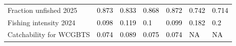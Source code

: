 \documentclass[
]{scrartcl}
\begin{document}
\begin{landscape}
\begin{longtable}[t]{ll>{\raggedright\arraybackslash}p{5em}>{\raggedright\arraybackslash}p{5em}>{\raggedright\arraybackslash}p{5em}>{\raggedright\arraybackslash}p{5em}>{\raggedright\arraybackslash}p{5em}}
\hspace{1em}Fraction unfished 2025 & \textcolor{black}{0.873} & \textcolor{black}{0.833} & \textcolor{black}{0.868} & \textcolor{black}{0.872} & \textcolor{black}{0.742} & \textcolor{black}{0.714}\\
\hspace{1em}Fishing intensity 2024 & \textcolor{black}{0.098} & \textcolor{black}{0.119} & \textcolor{black}{0.1} & \textcolor{black}{0.099} & \textcolor{black}{0.182} & \textcolor{black}{0.2}\\
\hspace{1em}Catchability for WCGBTS & \textcolor{black}{0.074} & \textcolor{black}{0.089} & \textcolor{black}{0.075} & \textcolor{black}{0.074} & \textcolor{black}{NA} & \textcolor{black}{NA}\\
\bottomrule

\end{longtable}

\endgroup{}


\end{landscape}

\newpage{}
\end{document}
